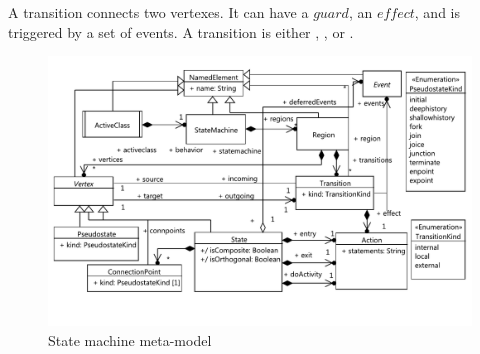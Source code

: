 	A transition connects two vertexes.%
	It can have a $guard$, an $effect$, and is triggered by a set of events. 
	A transition 
	is either , , or . %

\begin{figure}
	\centering
	\includegraphics[clip, trim=0.2cm 1.5cm 0.2cm 0.5cm, width=1.0\columnwidth]{figures/smmetamodel.pdf}
	\caption{State machine meta-model} 
	\label{fig:smmetamodel}
\end{figure}

